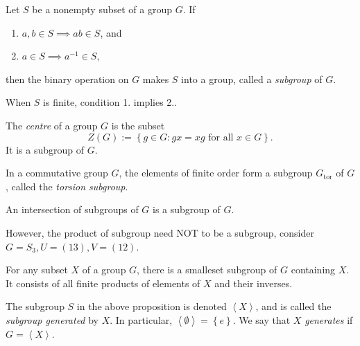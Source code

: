 \begin{definition}
  \label{definition-subgroup}
  Let \( S \) be a nonempty subset of a group \( G \).
  If
  \begin{enumerate}
    \item \( a, b \in S \implies ab \in S \), and
    \item \( a \in S \implies a^{-1} \in S \),
  \end{enumerate}
  then the binary operation on \( G \) makes \( S \) into a group, called a \emph{subgroup} of \( G \).
\end{definition}
\begin{remark}
  \label{remark-subgroup-conditions}
  When \( S \) is finite, condition 1. implies 2..
\end{remark}

\begin{definition}
  \label{definition-centre}
  The \emph{centre} of a group \( G \) is the subset
  \[
    Z(G) := \left\lbrace g \in G: gx = xg \text{ for all } x \in G \right\rbrace.
  \]
  It is a subgroup of \( G \).
\end{definition}

\begin{definition}
  \label{definition-torsion-subgroup}
  In a commutative group \( G \), the elements of finite order form a subgroup \( G_{\text{tor}} \) of \( G \), called the \emph{torsion subgroup}.
\end{definition}


\begin{proposition}
  \label{proposition-intersection-of-subgroups}
  An intersection of subgroups of \( G \) is a subgroup of \( G \).
\end{proposition}

\begin{example}
  \label{example-subgroup-product-not-subgroup}
  However, the product of subgroup need NOT to be a subgroup, consider \( G = S_3, U = (13), V = (12) \).
\end{example}

\begin{proposition}
  \label{proposition-subset-generate-subgroup}
  For any subset \( X \) of a group \( G \), there is a smalleset subgroup of \( G \) containing \( X \).
  It consists of all finite products of elements of \( X \) and their inverses.
\end{proposition}

\begin{definition}
  \label{definition-generate}
  The subgroup \( S \) in the above proposition is denoted \( \left\langle X \right\rangle \), and is called the \emph{subgroup generated} by \( X \).
  In particular, \( \left\langle \emptyset \right\rangle = \left\lbrace e \right\rbrace \).
  We say that \( X \) \emph{generates} if \( G = \left\langle X \right\rangle \).
\end{definition}


